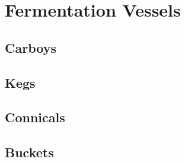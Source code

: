 \section{Fermentation Vessels}
 \subsection{Carboys}
 \subsection{Kegs}
 \subsection{Connicals}
 \subsection{Buckets}
